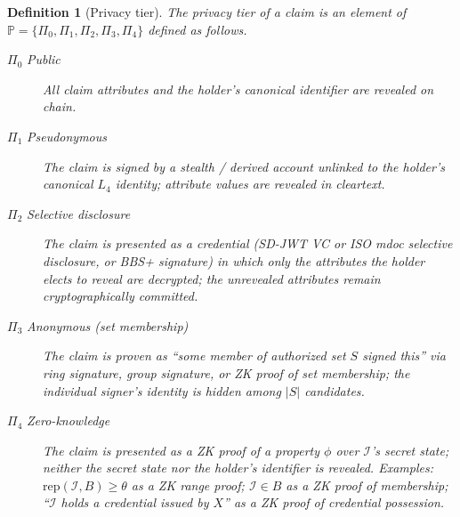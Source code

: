 \documentclass[11pt,a4paper,parskip=half-,DIV=12,headings=standardclasses]{scrartcl}
\theoremstyle{ncthm}
\theoremstyle{ncdef}
\newtheorem{definition}[theorem]{Definition}
\newcommand{\identity}{\mathcal{I}}
\begin{document}
\begin{definition}[Privacy tier]\label{def:privacy-tier}
The \emph{privacy tier} of a claim is an element of
$\mathbb{P} = \{\Pi_0, \Pi_1, \Pi_2, \Pi_3, \Pi_4\}$ defined as
follows.
\begin{description}
\item[$\Pi_0$ \emph{Public}] All claim attributes and the holder's
  canonical identifier are revealed on chain.
\item[$\Pi_1$ \emph{Pseudonymous}] The claim is signed by a stealth /
  derived account unlinked to the holder's canonical $L_4$ identity;
  attribute values are revealed in cleartext.
\item[$\Pi_2$ \emph{Selective disclosure}] The claim is presented as
  a credential (SD-JWT VC or ISO mdoc selective disclosure, or BBS+
  signature) in which only the attributes the holder elects to
  reveal are decrypted; the unrevealed attributes remain
  cryptographically committed.
\item[$\Pi_3$ \emph{Anonymous (set membership)}] The claim is proven
  as ``some member of authorized set $S$ signed this'' via ring
  signature, group signature, or ZK proof of set membership; the
  individual signer's identity is hidden among $|S|$ candidates.
\item[$\Pi_4$ \emph{Zero-knowledge}] The claim is presented as a ZK
  proof of a property $\phi$ over $\identity$'s secret state; neither
  the secret state nor the holder's identifier is revealed. Examples:
  $\mathrm{rep}(\identity, B) \geq \theta$ as a ZK range proof;
  $\identity \in B$ as a ZK proof of membership; ``$\identity$ holds
  a credential issued by $X$'' as a ZK proof of credential possession.
\end{description}
\end{definition}
\end{document}
